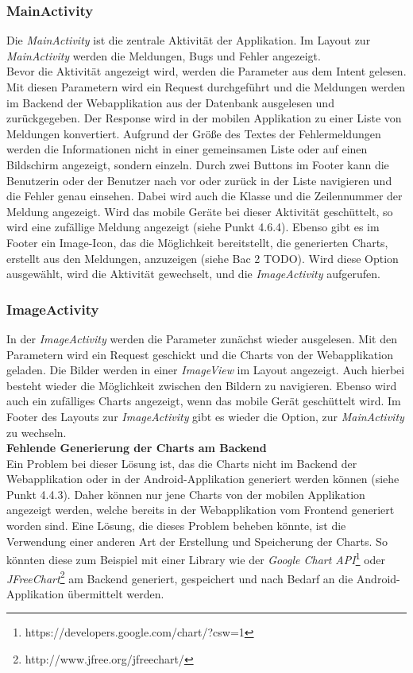\subsubsection{MainActivity}
Die \textit{MainActivity} ist die zentrale Aktivität der Applikation. Im Layout zur \textit{MainActivity} werden die Meldungen, Bugs und Fehler angezeigt. \\ Bevor die Aktivität angezeigt wird, werden die Parameter aus dem Intent gelesen. Mit diesen Parametern wird ein Request durchgeführt und die Meldungen werden im Backend der Webapplikation aus der Datenbank ausgelesen und zurückgegeben. Der Response wird in der mobilen Applikation zu einer Liste von Meldungen konvertiert. Aufgrund der Größe des Textes der Fehlermeldungen werden die Informationen nicht in einer gemeinsamen Liste oder auf einen Bildschirm angezeigt, sondern einzeln. Durch zwei Buttons im Footer kann die Benutzerin oder der Benutzer  nach vor oder zurück in der Liste navigieren und die Fehler genau einsehen. Dabei wird auch die Klasse und die Zeilennummer der Meldung angezeigt. Wird das mobile Geräte bei dieser Aktivität geschüttelt, so wird eine zufällige Meldung angezeigt (siehe Punkt 4.6.4). Ebenso gibt es im Footer ein Image-Icon, das die Möglichkeit bereitstellt, die generierten Charts, erstellt aus den Meldungen, anzuzeigen (siehe Bac 2 TODO). Wird diese Option ausgewählt, wird die Aktivität gewechselt, und die \textit{ImageActivity} aufgerufen.
\subsubsection{ImageActivity}
In der \textit{ImageActivity} werden die Parameter zunächst wieder ausgelesen. Mit den Parametern wird ein Request geschickt und die Charts von der Webapplikation geladen. Die Bilder werden in einer \textit{ImageView} im Layout angezeigt. Auch hierbei besteht wieder die Möglichkeit zwischen den Bildern zu navigieren. Ebenso wird auch ein zufälliges Charts angezeigt, wenn das mobile Gerät geschüttelt wird. Im Footer des Layouts zur \textit{ImageActivity} gibt es wieder die Option, zur \textit{MainActivity} zu wechseln. \\
\textbf{Fehlende Generierung der Charts am Backend} \\
Ein Problem bei dieser Lösung ist, das die Charts nicht im Backend der Webapplikation oder in der Android-Applikation generiert werden können (siehe Punkt 4.4.3). Daher können nur jene Charts von der mobilen Applikation angezeigt werden, welche bereits in der Webapplikation vom Frontend generiert worden sind. Eine Lösung, die dieses Problem beheben könnte, ist die Verwendung einer anderen Art der Erstellung und Speicherung der Charts. So könnten diese zum Beispiel mit einer Library wie der \textit{Google Chart API}\footnote{https://developers.google.com/chart/?csw=1} oder \textit{JFreeChart}\footnote{http://www.jfree.org/jfreechart/} am Backend generiert, gespeichert und nach Bedarf an die Android-Applikation übermittelt werden.
